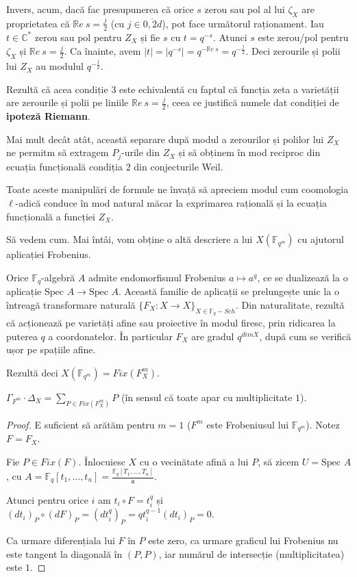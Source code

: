 \documentclass[13pt,openany]{book}
\begin{document}
Invers, acum, dacă fac presupunerea că orice $s$ zerou sau pol al lui $\zeta_X$ are proprietatea că $\mathbb{R}e\ s=\frac{j}{2}$ (cu $j\in\overline{0,2d}$), pot face următorul raționament. Iau $t \in \mathbb{C}^*$ zerou sau pol pentru $Z_X$ și fie $s$ cu $t=q^{-s}$. Atunci $s$ este zerou/pol pentru $\zeta_X$ și $\mathbb{R}e\ s=\frac{j}{2}$. Ca înainte, avem $\mid t\mid =\mid q^{-s}\mid =q^{-\mathbb{R}e\ s}=q^{-\frac{j}{2}}$. Deci zerourile și polii lui $Z_X$ au modulul $q^{-\frac{j}{2}}$.

Rezultă că acea condiție 3 este echivalentă cu faptul că funcția zeta a varietății are zerourile și polii pe liniile $\mathbb{R}e\ s=\frac{j}{2}$, ceea ce justifică numele dat condiției de {\bf ipoteză Riemann}.

Mai mult decât atât, această separare după modul a zerourilor și polilor lui $Z_X$ ne permitm să extragem $P_j$-urile din $Z_X$ și să obținem în mod reciproc din ecuația funcțională condiția 2 din conjecturile Weil.

Toate aceste manipulări de formule ne învață să apreciem modul cum coomologia $\ell$-adică conduce în mod natural măcar la exprimarea rațională și la ecuația funcțională a funcției $Z_X$.

Să vedem cum. Mai întâi, vom obține o altă descriere a lui $X(\mathbb{F}_{q^m})$ cu ajutorul aplicației Frobenius.

Orice $\mathbb{F}_q$-algebră $A$ admite endomorfismul Frobenius $a \mapsto a^q$, ce se dualizează la o aplicație $\text{Spec } A \rightarrow \text{Spec } A$. Această familie de aplicații se prelungește unic la o întreagă transformare naturală $\{F_X : X \rightarrow X\}_{X \in \mathbb{F}_q-Sch}$. Din naturalitate, rezultă că acționează pe varietăți afine sau proiective în modul firesc, prin ridicarea la puterea $q$ a coordonatelor. În particular $F_X$ are gradul $q^{dim X}$, după cum se verifică ușor pe spațiile afine.

Rezultă deci  $X(\mathbb{F}_{q^m})=Fix(F_X^m)$.

\begin{lema}
$\Gamma_{F^m} \cdot \Delta_X = \sum\limits_{P \in Fix(F_X^m)} P$ (în sensul că toate apar cu multiplicitate $1$).
\end{lema}

\begin{proof}
E suficient să arătăm pentru $m=1$ ($F^m$ este Frobeniusul lui $\mathbb{F}_{q^m}$). Notez $F=F_X$.

Fie $P\in Fix(F)$. Înlocuiesc $X$ cu o vecinătate afină a lui $P$, să zicem $U=\text{Spec }A$, cu $A=\mathbb{F}_q[t_1,...,t_n]=\frac{\mathbb{F}_q[T_1,...,T_n]}{\mathfrak{a}}$.

Atunci pentru orice $i$ am $t_i \circ F = t_i^q$ și $(dt_i)_P \circ (dF)_P = (dt_i^q)_P = qt_i^{q-1}(dt_i)_P = 0$.

Ca urmare diferențiala lui $F$ în $P$ este zero, ca urmare graficul lui Frobenius nu este tangent la diagonală în $(P,P)$, iar numărul de intersecție (multiplicitatea) este $1$. 
\end{proof}
\end{document}
